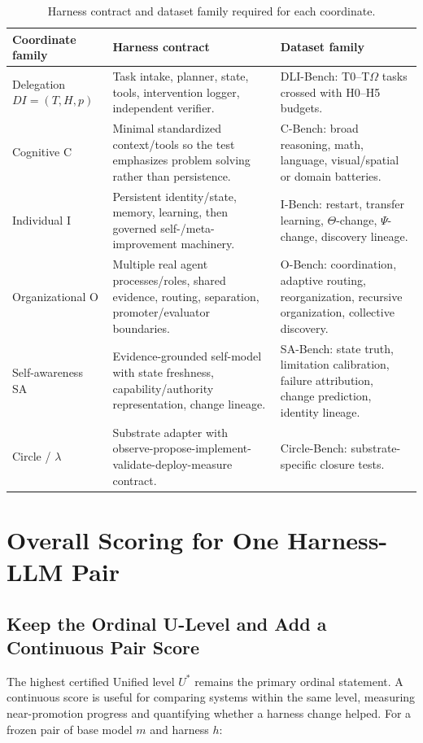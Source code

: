 \documentclass[11pt]{article}
\theoremstyle{definition}
\newcommand{\Om}{\ensuremath{\Omega}}
\begin{document}
\begin{table}[!htbp]
\centering\small
\begin{tabularx}{\textwidth}{@{}lYY@{}}
\toprule
Coordinate family & Harness contract & Dataset family \\
\midrule
Delegation $DI=(T,H,p)$ & Task intake, planner, state, tools, intervention logger, independent verifier. & DLI-Bench: T0--T\Om{} tasks crossed with H0--H5 budgets. \\
Cognitive C & Minimal standardized context/tools so the test emphasizes problem solving rather than persistence. & C-Bench: broad reasoning, math, language, visual/spatial or domain batteries. \\
Individual I & Persistent identity/state, memory, learning, then governed self-/meta-improvement machinery. & I-Bench: restart, transfer learning, $\Theta$-change, $\Psi$-change, discovery lineage. \\
Organizational O & Multiple real agent processes/roles, shared evidence, routing, separation, promoter/evaluator boundaries. & O-Bench: coordination, adaptive routing, reorganization, recursive organization, collective discovery. \\
Self-awareness SA & Evidence-grounded self-model with state freshness, capability/authority representation, change lineage. & SA-Bench: state truth, limitation calibration, failure attribution, change prediction, identity lineage. \\
Circle / $\lambda$ & Substrate adapter with observe-propose-implement-validate-deploy-measure contract. & Circle-Bench: substrate-specific closure tests. \\
\bottomrule
\end{tabularx}
\caption{Harness contract and dataset family required for each coordinate.}
\label{tab:contracts}
\end{table}

\section{Overall Scoring for One Harness-LLM Pair}\label{sec:hlis}

\subsection{Keep the Ordinal U-Level and Add a Continuous Pair Score}

The highest certified Unified level $U^{*}$ remains the primary ordinal statement. A continuous score is useful for comparing systems within the same level, measuring near-promotion progress and quantifying whether a harness change helped. For a frozen pair of base model $m$ and harness $h$:
\end{document}
